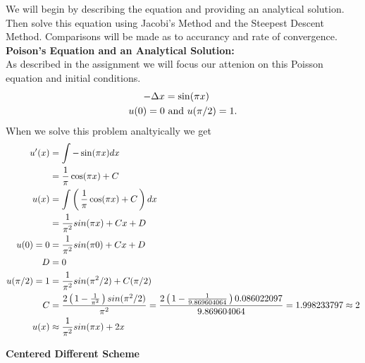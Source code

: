 \documentclass[10pt,a4paper]{report}
\begin{document}
	We will begin by describing the equation and providing an analytical solution.  Then solve this equation using Jacobi's Method and the Steepest Descent Method.  Comparisons will be made as to accurancy and rate of convergence.\\
	
\noindent\textbf{Poison's Equation and an Analytical Solution:}\\

As described in the assignment we will focus our attenion on this Poisson equation and initial conditions.
\begin{align*}
	-\Delta x &= \sin(\pi x)\\
	u(0) = 0 &\text{ and } u(\pi/2)=1.
\end{align*}When we solve this problem analtyically we get
\begin{align*}
	u'(x) &= \int -\sin(\pi x) dx \\
	&= \frac{1}{\pi}\cos(\pi x)+C \\
	u(x) &= \int \left (\, \frac{1}{\pi}\cos(\pi x)+C \,\right ) dx \\
	&= \frac{1}{\pi^2}sin(\pi x) + Cx + D \\
	u(0) = 0 &= \frac{1}{\pi^2}sin(\pi 0) + Cx + D \\
	D &= 0 \\
	u(\pi/2) =1 &= \frac{1}{\pi^2}sin(\pi^2/2) + C(\pi/2) \\
	C &= \frac{2\left (\, 1-\frac{1}{\pi^2} \,\right )sin(\pi^2/2)}{\pi^2}=\frac{2\left (\, 1-\frac{1}{9.869604064} \,\right )0.086022097}{9.869604064} = 1.998233797 \approx 2 \\
	u(x) &\approx \frac{1}{\pi^2}sin(\pi x) + 2x \\
\end{align*}

\noindent\textbf{Centered Different Scheme}\\
\end{document}

